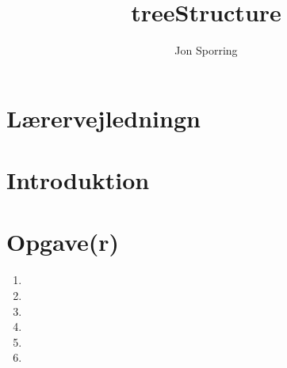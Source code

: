 \documentclass[a4paper,12pt]{article}
\title{treeStructure}
\author{Jon Sporring}
\begin{document}
\maketitle

\section{Lærervejledningn}

\section{Introduktion}

\section{Opgave(r)}
\begin{enumerate}
\item 
\item 
\item 
\item 
\item 
\item 
\end{enumerate}
\end{document}

